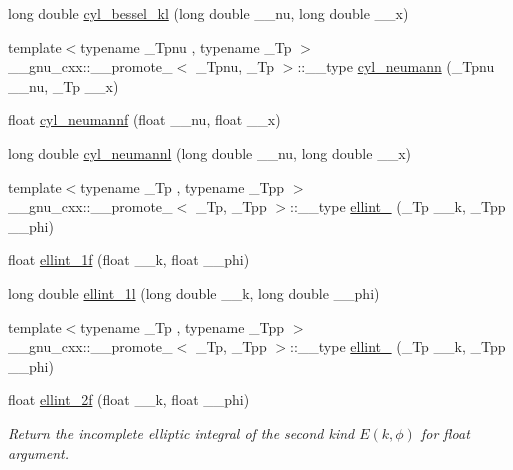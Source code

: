 \begin{DoxyCompactItemize}
\item 
long double \hyperlink{group__tr29124__math__spec__func_gac35194b926270d7857d651e06198c7d3}{cyl\+\_\+bessel\+\_\+kl} (long double \+\_\+\+\_\+nu, long double \+\_\+\+\_\+x)
\item 
{\footnotesize template$<$typename \+\_\+\+Tpnu , typename \+\_\+\+Tp $>$ }\\\+\_\+\+\_\+gnu\+\_\+cxx\+::\+\_\+\+\_\+promote\+\_$<$ \+\_\+\+Tpnu, \+\_\+\+Tp $>$\+::\+\_\+\+\_\+type \hyperlink{group__tr29124__math__spec__func_ga5b7c72ab85e361cbd73f1a3b5f0725a6}{cyl\+\_\+neumann} (\+\_\+\+Tpnu \+\_\+\+\_\+nu, \+\_\+\+Tp \+\_\+\+\_\+x)
\item 
float \hyperlink{group__tr29124__math__spec__func_ga604c13e8f2bb7cd3c7c91d8b19d6b13a}{cyl\+\_\+neumannf} (float \+\_\+\+\_\+nu, float \+\_\+\+\_\+x)
\item 
long double \hyperlink{group__tr29124__math__spec__func_gaf8986bae9a523c48d861d233835bda8f}{cyl\+\_\+neumannl} (long double \+\_\+\+\_\+nu, long double \+\_\+\+\_\+x)
\item 
{\footnotesize template$<$typename \+\_\+\+Tp , typename \+\_\+\+Tpp $>$ }\\\+\_\+\+\_\+gnu\+\_\+cxx\+::\+\_\+\+\_\+promote\+\_$<$ \+\_\+\+Tp, \+\_\+\+Tpp $>$\+::\+\_\+\+\_\+type \hyperlink{group__tr29124__math__spec__func_gae6b3df5556f38a7d72f9b4457d856f9c}{ellint\+\_} (\+\_\+\+Tp \+\_\+\+\_\+k, \+\_\+\+Tpp \+\_\+\+\_\+phi)
\item 
float \hyperlink{group__tr29124__math__spec__func_ga308d23d70f4b5e848eb7a4173628ef3b}{ellint\+\_\+1f} (float \+\_\+\+\_\+k, float \+\_\+\+\_\+phi)
\item 
long double \hyperlink{group__tr29124__math__spec__func_ga795383fa51e02351000b410b478d824f}{ellint\+\_\+1l} (long double \+\_\+\+\_\+k, long double \+\_\+\+\_\+phi)
\item 
{\footnotesize template$<$typename \+\_\+\+Tp , typename \+\_\+\+Tpp $>$ }\\\+\_\+\+\_\+gnu\+\_\+cxx\+::\+\_\+\+\_\+promote\+\_$<$ \+\_\+\+Tp, \+\_\+\+Tpp $>$\+::\+\_\+\+\_\+type \hyperlink{group__tr29124__math__spec__func_gad6dd71db2b3f90d24ff49bf8cf37bc37}{ellint\+\_} (\+\_\+\+Tp \+\_\+\+\_\+k, \+\_\+\+Tpp \+\_\+\+\_\+phi)
\item 
float \hyperlink{group__tr29124__math__spec__func_ga594a730163c6228c75b152462700062b}{ellint\+\_\+2f} (float \+\_\+\+\_\+k, float \+\_\+\+\_\+phi)
\begin{DoxyCompactList}\small\item\em Return the incomplete elliptic integral of the second kind $ E(k,\phi) $ for {\ttfamily float} argument. \end{DoxyCompactList}\item 

\end{DoxyCompactItemize}
